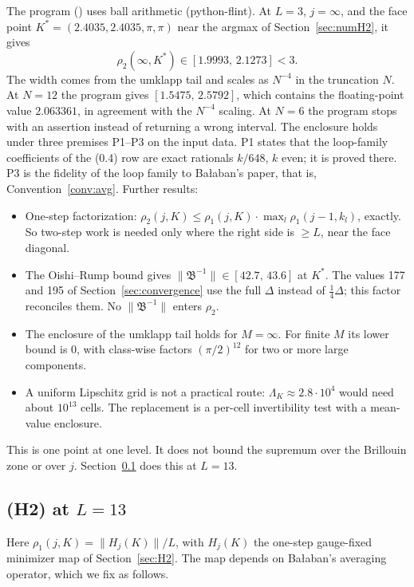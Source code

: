 The program  () uses ball arithmetic (python-flint). At $L=3$, $j=\infty$, and the face point $K^*=(2.4035,2.4035,\pi,\pi)$ near the argmax of Section~\ref{sec:numH2}, it gives
\[
\rho_2(\infty,K^*)\in[1.9993,\,2.1273]<3 .
\]
The width comes from the umklapp tail and scales as $N^{-4}$ in the truncation $N$. At $N=12$ the program gives $[1.5475,\,2.5792]$, which contains the floating-point value $2.063361$, in agreement with the $N^{-4}$ scaling. At $N=6$ the program stops with an assertion instead of returning a wrong interval. The enclosure holds under three premises P1--P3 on the input data. P1 states that the loop-family coefficients of the (0.4) row are exact rationals $k/648$, $k$ even; it is proved there. P3 is the fidelity of the loop family to Ba{\l}aban's paper, that is, Convention~\ref{conv:avg}. Further results:
\begin{itemize}
\item One-step factorization: $\rho_2(j,K)\le\rho_1(j,K)\cdot\max_l\rho_1(j-1,k_l)$, exactly. So two-step work is needed only where the right side is $\ge L$, near the face diagonal.
\item The Oishi--Rump bound gives $\|\mathfrak B^{-1}\|\in[42.7,\,43.6]$ at $K^*$. The values 177 and 195 of Section~\ref{sec:convergence} use the full $\Delta$ instead of $\tfrac14\Delta$; this factor reconciles them. No $\|\mathfrak B^{-1}\|$ enters $\rho_2$.
\item The enclosure of the umklapp tail holds for $M=\infty$. For finite $M$ its lower bound is 0, with class-wise factors $(\pi/2)^{12}$ for two or more large components.
\item A uniform Lipschitz grid is not a practical route: $\Lambda_K\approx2.8\cdot10^4$ would need about $10^{13}$ cells. The replacement is a per-cell invertibility test with a mean-value enclosure.
\end{itemize}
This is one point at one level. It does not bound the supremum over the Brillouin zone or over $j$. Section~\ref{sec:certH2} does this at $L=13$.

\subsection{(H2) at $L=13$}\label{sec:certH2}

Here $\rho_1(j,K)=\|H_j(K)\|/L$, with $H_j(K)$ the one-step gauge-fixed minimizer map of Section~\ref{sec:H2}. The map depends on Ba{\l}aban's averaging operator, which we fix as follows.

